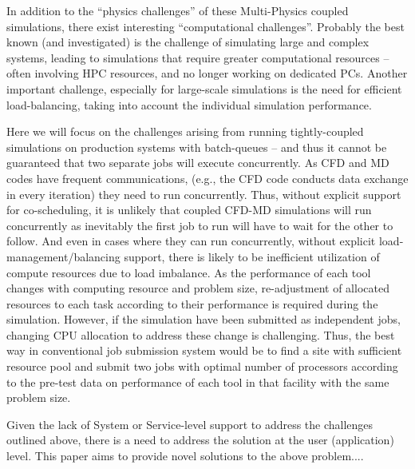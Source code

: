 \documentclass[times, 10pt,twocolumn]{article}
\begin{document}
In addition to the ``physics challenges'' of these Multi-Physics coupled simulations, there exist interesting ``computational challenges''. Probably the best known (and investigated) is the challenge of simulating large and complex systems, leading to simulations that require greater computational resources -- often involving HPC resources, and no longer working on dedicated PCs. Another important challenge, especially for large-scale simulations is the need for efficient load-balancing, taking into account the individual simulation performance.

Here we will focus on the challenges arising from running tightly-coupled simulations on production systems with batch-queues -- and thus it cannot be guaranteed that two separate jobs will execute concurrently.  As CFD and MD codes have frequent communications, (e.g., the CFD code conducts data exchange in every iteration) they need to run concurrently.  Thus, without explicit support for co-scheduling, it is unlikely that coupled CFD-MD simulations will run concurrently as inevitably the first job to run will have to wait for the other to follow.
And even in cases where they can run concurrently, without explicit load-management/balancing support, there is likely to be inefficient utilization of compute resources due to load imbalance.  As the performance of each tool changes with computing resource and problem size, re-adjustment of allocated resources to each task according to their performance is required during the simulation. However, if the simulation have been submitted as independent jobs, changing CPU allocation to address these change is challenging. Thus, the best way in conventional job submission system would be to find a site with sufficient resource pool and submit two jobs with optimal number of processors according to the pre-test data on performance of each tool in that facility with the same problem size.

Given the lack of System or Service-level support to address the challenges outlined above, there is a need to address the solution at the user (application) level. This paper aims to provide novel solutions to the above problem....
\end{document}
